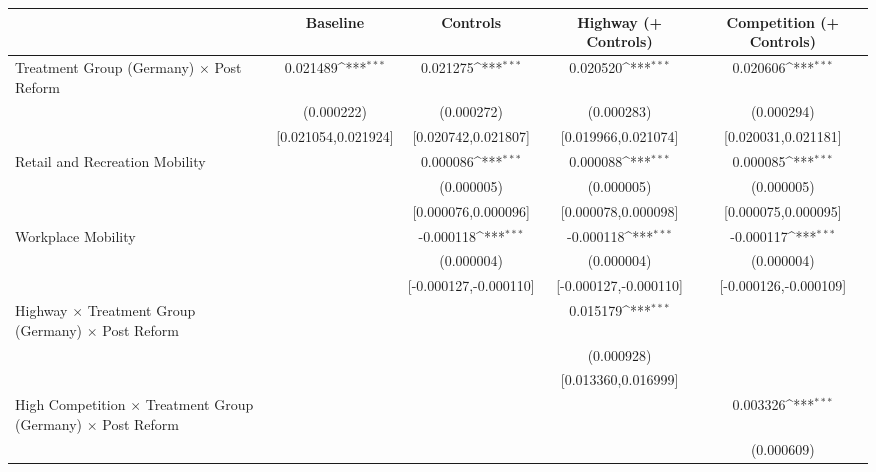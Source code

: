 {
\def\sym#1{\ifmmode^{#1}\else\(^{#1}\)\fi}
\begin{tabular}{l*{4}{c}}
\toprule
                    &\multicolumn{1}{c}{Baseline}&\multicolumn{1}{c}{Controls}&\multicolumn{1}{c}{Highway (+ Controls)}&\multicolumn{1}{c}{Competition (+ Controls)}\\
\midrule
Treatment Group (Germany) $\times$ Post Reform&    0.021489\sym{***}&    0.021275\sym{***}&    0.020520\sym{***}&    0.020606\sym{***}\\
                    &  (0.000222)         &  (0.000272)         &  (0.000283)         &  (0.000294)         \\
                    &[0.021054,0.021924]         &[0.020742,0.021807]         &[0.019966,0.021074]         &[0.020031,0.021181]         \\
Retail and Recreation Mobility&                     &    0.000086\sym{***}&    0.000088\sym{***}&    0.000085\sym{***}\\
                    &                     &  (0.000005)         &  (0.000005)         &  (0.000005)         \\
                    &                     &[0.000076,0.000096]         &[0.000078,0.000098]         &[0.000075,0.000095]         \\
Workplace Mobility  &                     &   -0.000118\sym{***}&   -0.000118\sym{***}&   -0.000117\sym{***}\\
                    &                     &  (0.000004)         &  (0.000004)         &  (0.000004)         \\
                    &                     &[-0.000127,-0.000110]         &[-0.000127,-0.000110]         &[-0.000126,-0.000109]         \\
Highway $\times$ Treatment Group (Germany) $\times$ Post Reform&                     &                     &    0.015179\sym{***}&                     \\
                    &                     &                     &  (0.000928)         &                     \\
                    &                     &                     &[0.013360,0.016999]         &                     \\
High Competition $\times$ Treatment Group (Germany) $\times$ Post Reform&                     &                     &                     &    0.003326\sym{***}\\
                    &                     &                     &                     &  (0.000609)         \\

\end{tabular}}
